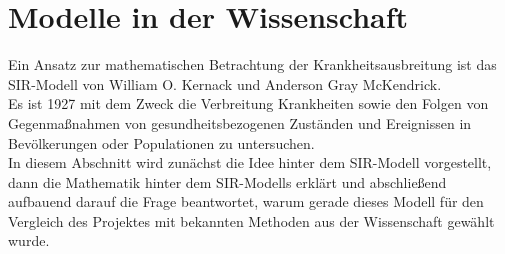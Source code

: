 \section*{Modelle in der Wissenschaft}
Ein Ansatz zur mathematischen Betrachtung der Krankheitsausbreitung ist das SIR-Modell von William O. Kernack und Anderson Gray McKendrick.\\
Es ist 1927 mit dem Zweck die Verbreitung Krankheiten sowie den Folgen von Gegenmaßnahmen von gesundheitsbezogenen Zuständen und Ereignissen in Bevölkerungen oder Populationen zu untersuchen.\citep{jdmurray}\\
In diesem Abschnitt wird zunächst die Idee hinter dem SIR-Modell vorgestellt, dann die Mathematik hinter dem SIR-Modells erklärt und abschließend aufbauend darauf die Frage beantwortet, warum gerade dieses Modell für den Vergleich des Projektes mit bekannten Methoden aus der Wissenschaft gewählt wurde.
